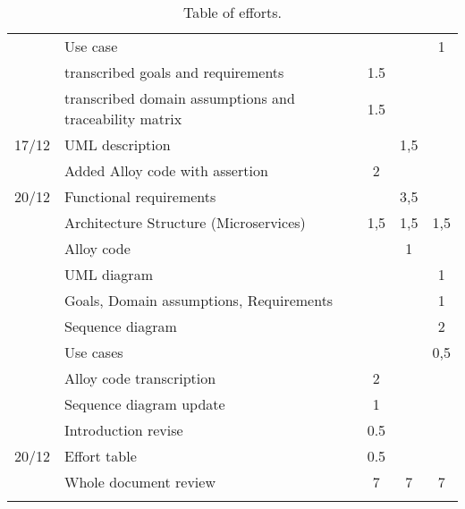 \begin{center}
\begin{longtable}{llccc}
        	&	Use case	&		&		&	1	\\
        	&	transcribed goals and requirements	&	1.5	&		&		\\
     	    &	transcribed domain assumptions and traceability matrix   	&	1.5	&		&		\\
        \hline
        17/12	&	UML description	&		&	1,5	&		\\
        	&	Added Alloy code with assertion	&	2	&		&		\\
        \hline
        20/12	&	Functional requirements	&		&	3,5	&		\\
        	&	Architecture Structure (Microservices)	&	1,5	&	1,5	&	1,5	\\
        	&	Alloy code	&		&	1	&		\\
        	&	UML diagram	&		&		&	1	\\
        	&	Goals, Domain assumptions, Requirements	&		&		&	1	\\
        	&	Sequence diagram	&		&		&	2	\\
        	&	Use cases	&		&		&	0,5	\\
        	&	Alloy code transcription	&	2	&		&		\\
        	&	Sequence diagram update	&	1	&		&		\\
        	&	Introduction revise	&	0.5	&		&		\\
        \hline
        20/12 & Effort table & 0.5 &    & \\
         & Whole document review & 7 & 7 & 7\\
        \hline
        
        \rowcolor{white}\caption{\label{tab:effort}Table of efforts.}
        
    \end{longtable}
\end{center}